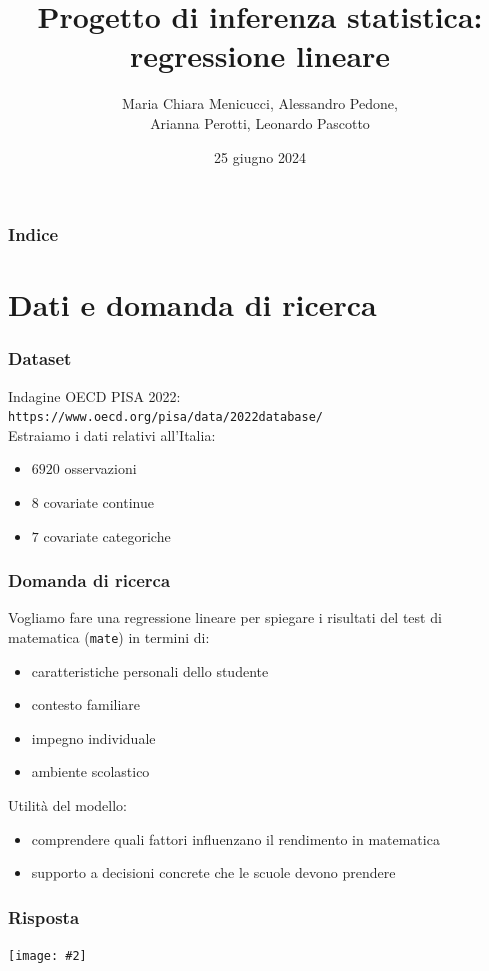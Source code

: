 \documentclass{beamer}
\title{Progetto di inferenza statistica: regressione lineare}
\author{Maria Chiara Menicucci, Alessandro Pedone,\\ Arianna Perotti, Leonardo Pascotto}
\institute{Politecnico di Milano}
\date{25 giugno 2024}
\newcommand{\fg}[2]{%
  \begin{center}
      \texttt{[image: \#2]}%
  \end{center}
}
\begin{document}
\frame{\titlepage}
\begin{frame}
    \frametitle{Indice}
    \tableofcontents
\end{frame}

\section{Dati e domanda di ricerca}

\begin{frame}
\frametitle{Dataset}
    Indagine OECD PISA 2022: \\
    \texttt{https://www.oecd.org/pisa/data/2022database/}\\
    Estraiamo i dati relativi all'Italia: 
    \begin{itemize}
        \item $6920$ osservazioni %
        \item $8$ covariate continue
        \item $7$ covariate categoriche
    \end{itemize}
\end{frame}

\begin{frame}
\frametitle{Domanda di ricerca}
	Vogliamo fare una regressione lineare per spiegare i risultati del test di matematica (\texttt{mate}) in termini di:
	\begin{itemize}
    \item caratteristiche personali dello studente
    \item contesto familiare
	\item impegno individuale 
	\item ambiente scolastico
	\end{itemize}
\end{frame}

\begin{frame}
    Utilità del modello:
    \begin{itemize}
        \item comprendere quali fattori influenzano il rendimento in matematica
        \item supporto a decisioni concrete che le scuole devono prendere
    \end{itemize}
\end{frame}

\begin{frame}
\frametitle{Risposta}
\fg{0.8}{histmate}
\end{frame}
\end{document}
